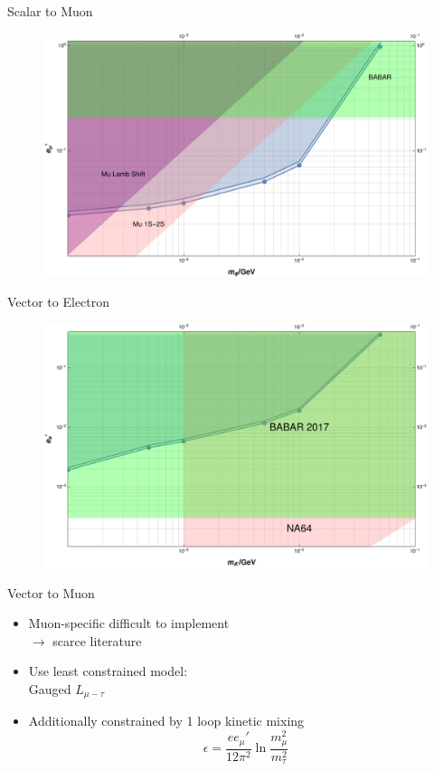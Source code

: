 \documentclass[11pt]{beamer}
\numberwithin{equation}{section}
\begin{document}
\begin{frame}{Scalar to Muon}
\begin{figure}[!ht]
  \centering
    \includegraphics[width=\textwidth]{../imgs/MuBoundOnScalarMuon}
\end{figure}
\end{frame}

\begin{frame}{Vector to Electron}
\begin{figure}[!ht]
  \centering
    \includegraphics[width=\textwidth]{../imgs/MuBoundOnVectorElectron}
\end{figure}
\end{frame}

\begin{frame}{Vector to Muon}
\begin{itemize}
\item Muon-specific difficult to implement \\
\pause
$\rightarrow$ scarce literature
\pause
\item Use least constrained model:
\\
Gauged $L_{\mu-\tau}$
\pause
\item Additionally constrained by 1 loop kinetic mixing
\pause
\begin{equation*}
\epsilon = \frac{ee_\mu'}{12\pi^2} \ln\frac{m_\mu^2}{m_\tau^2}
\end{equation*}
\end{itemize}
\end{frame}
\end{document}

